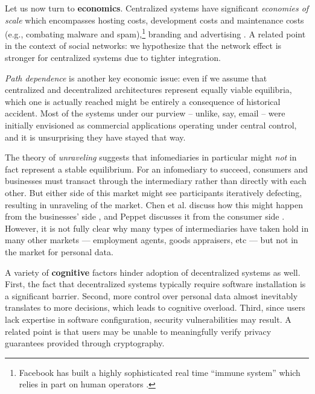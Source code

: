\documentclass{acm_proc_article-sp}
\begin{document}
Let us now turn to {\bf economics}. Centralized systems have significant \emph{economies of scale} which encompasses hosting costs, development costs and maintenance costs (e.g., combating malware and spam),\footnote{Facebook has built a highly sophisticated real time ``immune system'' which relies in part on human operators \cite{FIS}.} branding and advertising \cite{peles}. A related point in the context of social networks: we hypothesize that the network effect is stronger for centralized systems due to tighter integration.

\emph{Path dependence} is another key economic issue: even if we assume that centralized and decentralized architectures represent equally viable equilibria, which one is actually reached might be entirely a consequence of historical accident. Most of the systems under our purview -- unlike, say, email -- were initially envisioned as commercial applications operating under central control, and it is unsurprising they have stayed that way.

The theory of \emph{unraveling} suggests that infomediaries in particular might {\em not} in fact represent a stable equilibrium. For an infomediary to succeed, consumers and businesses must transact through the intermediary rather than directly with each other. But either side of this market might see participants iteratively defecting, resulting in unraveling of the market. Chen et al. discuss how this might happen from the businesses' side \cite{chen}, and Peppet discusses it from the consumer side \cite{Peppet_2010}. However, it is not fully clear why many types of intermediaries have taken hold in many other markets --- employment agents, goods appraisers, etc --- but not in the market for personal data.

A variety of \textbf{cognitive} factors hinder adoption of decentralized systems as well. First, the fact that decentralized systems typically require software installation is a significant barrier. Second, more control over personal data almost inevitably translates to more decisions, which leads to cognitive overload. Third, since users lack expertise in software configuration, security vulnerabilities may result. A related point is that users may be unable to meaningfully verify privacy guarantees provided through cryptography.
\end{document}
